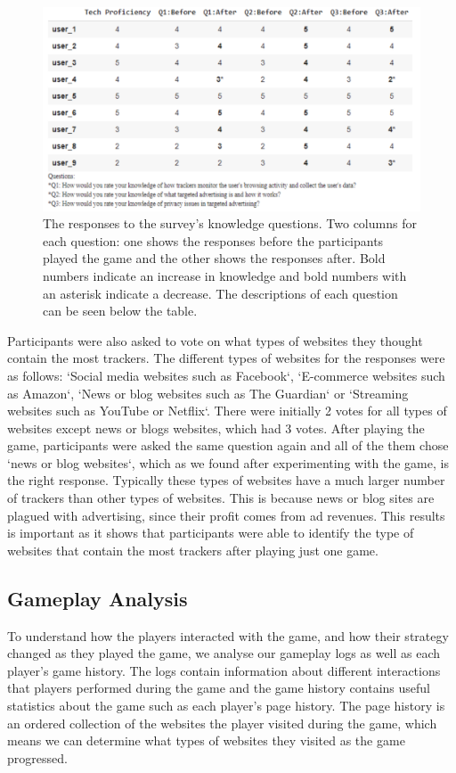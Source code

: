 \documentclass{l4proj}
\begin{document}
\begin{figure}
    \centering
    \includegraphics[width=1\linewidth]{images/know.pdf}    

    \caption{The responses to the survey's knowledge questions. Two columns for each question: one shows the responses before the participants played the game and the other shows the responses after. Bold numbers indicate an increase in knowledge and bold numbers with an asterisk indicate a decrease. The descriptions of each question can be seen below the table.}

    \label{fig:know} 
\end{figure}

Participants were also asked to vote on what types of websites they thought contain the most trackers. The different types of websites for the responses were as follows: `Social media websites such as Facebook`, `E-commerce websites such as Amazon`, `News or blog websites such as The Guardian` or `Streaming websites such as YouTube or Netflix`. There were initially 2 votes for all types of websites except news or blogs websites, which had 3 votes. 
After playing the game, participants were asked the same question again and all of the them chose `news or blog websites`, which as we found after experimenting with the game, is the right response. Typically these types of websites have a much larger number of trackers than other types of websites. This is because news or blog sites are plagued with advertising, since their profit comes from ad revenues. This results is important as it shows that participants were able to identify the type of websites that contain the most trackers after playing just one game.

\subsection{Gameplay Analysis}
To understand how the players interacted with the game, and how their strategy changed as they played the game, we analyse our gameplay logs as well as each player's game history. The logs contain information about different interactions that players performed during the game and the game history contains useful statistics about the game such as each player's page history. The page history is an ordered collection of the websites the player visited during the game, which means we can determine what types of websites they visited as the game progressed. 
\end{document}
